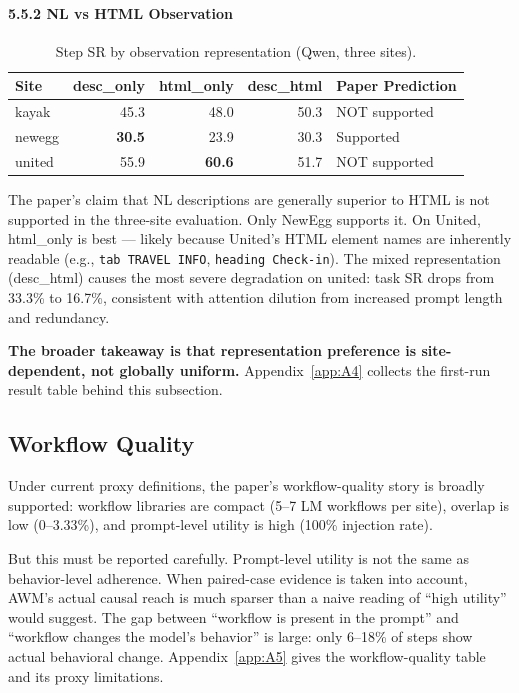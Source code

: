 \documentclass{article}
\begin{document}
\paragraph{5.5.2 NL vs HTML Observation}\label{nl-vs-html-observation}

{\begin{longtable}[]{@{}lrrrl@{}}
\caption{Step SR by observation representation (Qwen, three sites).}\label{tab:step-sr-by-observation-representation-qwen-th}\\

\toprule\noalign{}
Site & desc\_only & html\_only & desc\_html & Paper Prediction \\
\midrule\noalign{}
\endhead
\bottomrule\noalign{}
\endlastfoot
kayak & 45.3 & 48.0 & 50.3 & NOT supported \\
newegg & \textbf{30.5} & 23.9 & 30.3 & Supported \\
united & 55.9 & \textbf{60.6} & 51.7 & NOT supported \\
\end{longtable}
}

The paper's claim that NL descriptions are generally superior to HTML is
not supported in the three-site evaluation. Only NewEgg supports it. On
United, html\_only is best --- likely because United's HTML element
names are inherently readable (e.g., \texttt{tab\ TRAVEL\ INFO},
\texttt{heading\ Check-in}). The mixed representation (desc\_html)
causes the most severe degradation on united: task SR drops from 33.3\%
to 16.7\%, consistent with attention dilution from increased prompt
length and redundancy.

\textbf{The broader takeaway is that representation preference is
site-dependent, not globally uniform.} Appendix~\ref{app:A4} collects
the first-run result table behind this subsection.

\subsection{Workflow Quality}\label{c5-workflow-quality}

Under current proxy definitions, the paper's workflow-quality story is
broadly supported: workflow libraries are compact (5--7 LM workflows per
site), overlap is low (0--3.33\%), and prompt-level utility is high
(100\% injection rate).

But this must be reported carefully. Prompt-level utility is not the
same as behavior-level adherence. When paired-case evidence is taken
into account, AWM's actual causal reach is much sparser than a naive
reading of ``high utility'' would suggest. The gap between ``workflow is
present in the prompt'' and ``workflow changes the model's behavior'' is
large: only 6--18\% of steps show actual behavioral change.
Appendix~\ref{app:A5} gives the workflow-quality table and its proxy
limitations.
\end{document}
